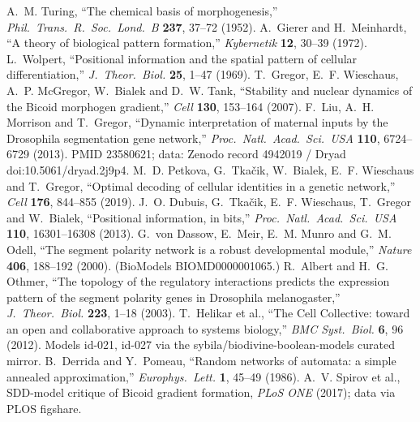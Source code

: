  A.~M. Turing, ``The chemical basis of morphogenesis,''
\emph{Phil.\ Trans.\ R.\ Soc.\ Lond.\ B} \textbf{237}, 37--72 (1952).
 A.~Gierer and H.~Meinhardt, ``A theory of biological
pattern formation,'' \emph{Kybernetik} \textbf{12}, 30--39 (1972).
 L.~Wolpert, ``Positional information and the spatial
pattern of cellular differentiation,'' \emph{J.\ Theor.\ Biol.} \textbf{25},
1--47 (1969).
 T.~Gregor, E.~F. Wieschaus, A.~P. McGregor, W.~Bialek
and D.~W. Tank, ``Stability and nuclear dynamics of the Bicoid morphogen
gradient,'' \emph{Cell} \textbf{130}, 153--164 (2007).
 F.~Liu, A.~H. Morrison and T.~Gregor, ``Dynamic
interpretation of maternal inputs by the Drosophila segmentation gene
network,'' \emph{Proc.\ Natl.\ Acad.\ Sci.\ USA} \textbf{110}, 6724--6729
(2013). PMID 23580621; data: Zenodo record 4942019 / Dryad
doi:10.5061/dryad.2j9p4.
 M.~D. Petkova, G.~Tka\v{c}ik, W.~Bialek, E.~F.
Wieschaus and T.~Gregor, ``Optimal decoding of cellular identities in a
genetic network,'' \emph{Cell} \textbf{176}, 844--855 (2019).
 J.~O. Dubuis, G.~Tka\v{c}ik, E.~F. Wieschaus,
T.~Gregor and W.~Bialek, ``Positional information, in bits,''
\emph{Proc.\ Natl.\ Acad.\ Sci.\ USA} \textbf{110}, 16301--16308 (2013).
 G.~von Dassow, E.~Meir, E.~M. Munro and G.~M.
Odell, ``The segment polarity network is a robust developmental module,''
\emph{Nature} \textbf{406}, 188--192 (2000). (BioModels BIOMD0000001065.)
 R.~Albert and H.~G. Othmer, ``The topology of the
regulatory interactions predicts the expression pattern of the segment
polarity genes in Drosophila melanogaster,'' \emph{J.\ Theor.\ Biol.}
\textbf{223}, 1--18 (2003).
 T.~Helikar et al., ``The Cell Collective: toward an
open and collaborative approach to systems biology,'' \emph{BMC Syst.\ Biol.}
\textbf{6}, 96 (2012). Models id-021, id-027 via the
sybila/biodivine-boolean-models curated mirror.
 B.~Derrida and Y.~Pomeau, ``Random networks of
automata: a simple annealed approximation,'' \emph{Europhys.\ Lett.}
\textbf{1}, 45--49 (1986).
 A.~V. Spirov et al., SDD-model critique of Bicoid
gradient formation, \emph{PLoS ONE} (2017); data via PLOS figshare.
